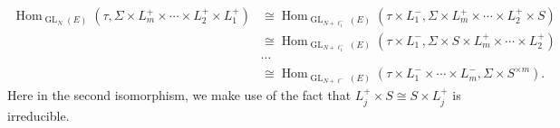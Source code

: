 \documentclass[11pt,letterpaper]{amsart}
\theoremstyle{plain}
\numberwithin{theorem}{section}
\numberwithin{equation}{subsection}
\theoremstyle{remark}
\newcommand{\Hom}{\operatorname{Hom}}
\newcommand{\GL}{\operatorname{GL}}
\begin{document}
\begin{align*}
  \Hom_{\GL_N\left(E\right)}\left(\tau, \Sigma\times L^+_m\times\cdots\times L_2^+\times L_1^+\right)&\cong \Hom_{\GL_{N+\ell^-_1}\left(E\right)}\left(\tau\times L^-_1, \Sigma\times L^+_m\times\cdots\times L_2^+\times S\right) \\
  &\cong\Hom_{\GL_{N+\ell^-_1}\left(E\right)}\left(\tau\times L^-_1, \Sigma\times S\times L^+_m\times\cdots\times L_2^+\right)\\
  &\cdots\\
  &\cong\Hom_{\GL_{N+\ell^-}\left(E\right)}\left(\tau\times L^-_1\times\cdots\times L^-_m, \Sigma\times S^{\times m}\right).
\end{align*}
Here in the second isomorphism, we make use of the fact that $L_j^+\times S\cong S\times L_j^+$ is irreducible.

\vskip 5pt
\end{document}
